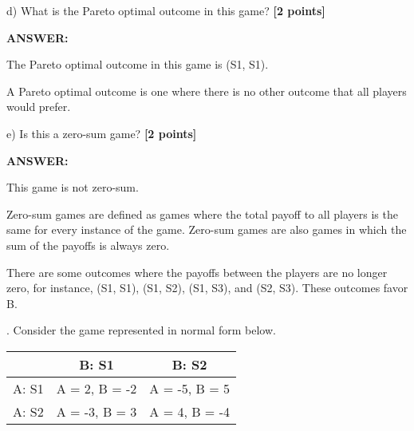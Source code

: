 \documentclass{article}
\begin{document}
\vspace{5mm}

\noindent d) What is the Pareto optimal outcome in this game? \textbf{[2 points]} 

\vspace{3mm}

\noindent \textbf{ANSWER:}

%
%
The Pareto optimal outcome in this game is (S1, S1).

A Pareto optimal outcome is one where there is no other outcome that all players would prefer.


\vspace{5mm}

\noindent e) Is this a zero-sum game? \textbf{[2 points] }

\vspace{3mm}

\noindent \textbf{ANSWER:}

%
%

This game is not zero-sum. 

Zero-sum games are defined as games where the total payoff to all players is the same for every instance of the game. Zero-sum games are also games in which the sum of the payoffs is always zero.

There are some outcomes where the payoffs between the players are no longer zero, for instance, (S1, S1), (S1, S2), (S1, S3), and (S2, S3). These outcomes favor B. 



\vspace{10mm}

\clearpage


.  Consider the game represented in normal form below. 

\vspace{3mm}



\begin{table*}[h]
    \centering
    \begin{tabular}{|c|c|c|}
    \hline
       & B: S1 & B: S2 \\ 
       \hline
        A: S1  & A = 2, B = -2 & A = -5, B = 5\\ 
        \hline
        A: S2 & A = -3, B = 3 & A = 4, B = -4 \\
        \hline
    \end{tabular}
\end{table*}
\end{document}
